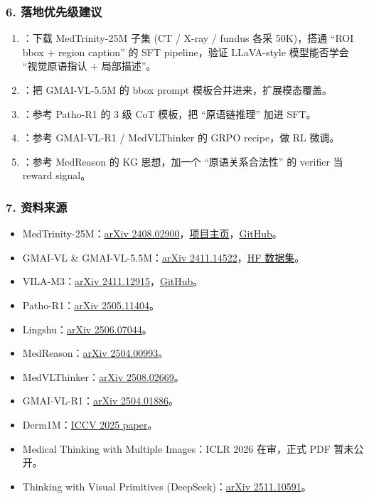 \subsubsection*{6. 落地优先级建议}

\begin{enumerate}[leftmargin=1.5em]
  \item {}：下载 MedTrinity-25M 子集 (CT / X-ray / fundus 各采 50K)，搭通 ``ROI bbox $+$ region caption'' 的 SFT pipeline，验证 LLaVA-style 模型能否学会 ``视觉原语指认 $+$ 局部描述''。
  \item {}：把 GMAI-VL-5.5M 的 bbox prompt 模板合并进来，扩展模态覆盖。
  \item {}：参考 Patho-R1 的 3 级 CoT 模板，把 ``原语链推理'' 加进 SFT。
  \item {}：参考 GMAI-VL-R1 / MedVLThinker 的 GRPO recipe，做 RL 微调。
  \item {}：参考 MedReason 的 KG 思想，加一个 ``原语关系合法性'' 的 verifier 当 reward signal。
\end{enumerate}

\subsubsection*{7. 资料来源}

\begin{itemize}[leftmargin=1.5em]
  \item MedTrinity-25M：\href{https://arxiv.org/abs/2408.02900}{arXiv 2408.02900}，\href{https://yunfeixie233.github.io/MedTrinity-25M/}{项目主页}，\href{https://github.com/UCSC-VLAA/MedTrinity-25M}{GitHub}。
  \item GMAI-VL \& GMAI-VL-5.5M：\href{https://arxiv.org/abs/2411.14522}{arXiv 2411.14522}，\href{https://huggingface.co/datasets/OpenGVLab/GMAI-VL-5.5M}{HF 数据集}。
  \item VILA-M3：\href{https://arxiv.org/abs/2411.12915}{arXiv 2411.12915}，\href{https://github.com/Project-MONAI/VLM}{GitHub}。
  \item Patho-R1：\href{https://arxiv.org/abs/2505.11404}{arXiv 2505.11404}。
  \item Lingshu：\href{https://arxiv.org/abs/2506.07044}{arXiv 2506.07044}。
  \item MedReason：\href{https://arxiv.org/abs/2504.00993}{arXiv 2504.00993}。
  \item MedVLThinker：\href{https://arxiv.org/abs/2508.02669}{arXiv 2508.02669}。
  \item GMAI-VL-R1：\href{https://arxiv.org/abs/2504.01886}{arXiv 2504.01886}。
  \item Derm1M：\href{https://openaccess.thecvf.com/content/ICCV2025/papers/Yan_Derm1M_A_Million-scale_Vision-Language_Dataset_Aligned_with_Clinical_Ontology_Knowledge_ICCV_2025_paper.pdf}{ICCV 2025 paper}。
  \item Medical Thinking with Multiple Images：ICLR 2026 在审，正式 PDF 暂未公开。
  \item Thinking with Visual Primitives (DeepSeek)：\href{https://arxiv.org/abs/2511.10591}{arXiv 2511.10591}。
\end{itemize}
